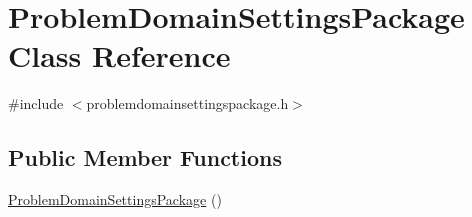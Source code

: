 \hypertarget{class_problem_domain_settings_package}{}\section{Problem\+Domain\+Settings\+Package Class Reference}
\label{class_problem_domain_settings_package}


{\ttfamily \#include $<$problemdomainsettingspackage.\+h$>$}

\subsection*{Public Member Functions}
\begin{DoxyCompactItemize}
\item 
\hyperlink{class_problem_domain_settings_package_acba5f13f17058d9182f23f7e79dfdb53}{Problem\+Domain\+Settings\+Package} ()\hypertarget{class_problem_domain_settings_package_acba5f13f17058d9182f23f7e79dfdb53}{}\label{class_problem_domain_settings_package_acba5f13f17058d9182f23f7e79dfdb53}


\end{DoxyCompactItemize}
